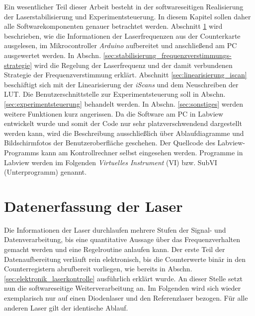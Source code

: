 Ein wesentlicher Teil dieser Arbeit besteht in der softwareseitigen Realisierung
der Laserstabilisierung und Experimentsteuerung. In diesem Kapitel sollen daher
alle Softwarekomponenten genauer betrachtet werden. Abschnitt
\ref{sec:datenerfassung_der_laser} wird beschrieben, wie die Informationen
der Laserfrequenzen aus der Counterkarte ausgelesen, im
Mikrocontroller \textit{Arduino} aufbereitet und anschließend am PC ausgewertet
werden. In Abschn. \ref{sec:stabilisierung_frequenzverstimmungs-strategie} wird die Regelung
der Laserfrequenz und der damit verbundenen Strategie der Frequenzverstimmung
erklärt. Abschnitt \ref{sec:linearisierung_iscan} beschäftigt sich mit der
Linearisierung der \textit{iScans} und dem Neuschreiben der LUT. Die
Benutzerschnittstelle zur Experimentsteuerung soll in Abschn.
\ref{sec:experimentsteuerung} behandelt werden. In Abschn. \ref{sec:sonstiges}
werden weitere Funktionen kurz angerissen. Da die Software am PC in
Labview entwickelt wurde und somit der Code nur sehr platzverschwendend
dargestellt werden kann, wird die Beschreibung ausschließlich über
Ablaufdiagramme und Bildschirmfotos der Benutzeroberfläche geschehen. Der
Quellcode des Labview-Programms kann am Kontrollrechner selbst eingesehen
werden. Programme in Labview werden im Folgenden \textit{Virtuelles
Instrument} (VI) bzw. SubVI (Unterprogramm) genannt.

\section{Datenerfassung der Laser}\label{sec:datenerfassung_der_laser}
Die Informationen der Laser durchlaufen mehrere Stufen der Signal- und
Datenverarbeitung, bis eine quantitative Aussage über das Frequenzverhalten
gemacht werden und eine Regelroutine anlaufen kann. Der erste Teil der
Datenaufbereitung verläuft rein elektronisch, bis die Counterwerte binär in
den Counterregistern abrufbereit vorliegen, wie bereits in Abschn.
\ref{sec:elektronik_laserkontrolle} ausführlich erklärt wurde. An dieser Stelle
setzt nun die softwareseitige Weiterverarbeitung an. Im Folgenden wird sich
wieder exemplarisch nur auf einen Diodenlaser und den Referenzlaser bezogen.
Für alle anderen Laser gilt der identische Ablauf.


